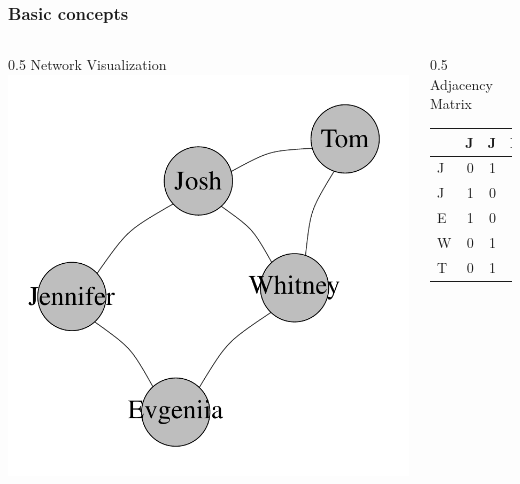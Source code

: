 \documentclass{beamer}
\begin{document}
\begin{frame}
	\frametitle{Basic concepts}
	
	\begin{columns}[T]
		\begin{column}{0.5\textwidth}
			\alert{Network Visualization}\\
			\includegraphics[width=1\textwidth]{figures/network-example.pdf}
		\end{column}
		\begin{column}{0.5\textwidth}
			\alert{Adjacency Matrix}\\
			\vspace{.50cm}
			\begin{tabular}{l|rrrrr}
				& J & J & E & W & T \\ \hline
				J & 0 & 1 & 1 & 0 & 0 \\ 
				J & 1 & 0 & 0 & 1 & 1 \\ 
				E & 1 & 0 & 0 & 1 & 0 \\ 
				W & 0 & 1 & 1 & 0 & 1 \\ 
				T & 0 & 1 & 0 & 1 & 0 \\ 
			\end{tabular}
		\end{column}
	\end{columns}
\end{frame}
\end{document}
